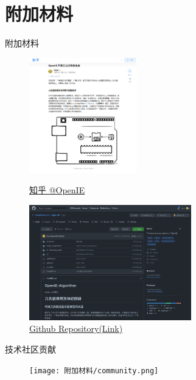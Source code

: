 \section{附加材料}
\begin{frame}{附加材料}
\begin{figure}[htbp]
\centering
\begin{minipage}[t]{0.35\textwidth}
\centering
\includegraphics[height=5cm]{附加材料/zhihu.png}
\caption{\href{https://zhuanlan.zhihu.com/p/585306798}{知乎 @OpenIE}}
\end{minipage}
\begin{minipage}[t]{0.60\textwidth}
\centering
\includegraphics[height=5cm]{附加材料/github.png}
\caption{\href{https://github.com/QianZeHao123/OpenIE}{Github Repository(Link)}}
\end{minipage}
\end{figure}
\end{frame}
% 
% 
\begin{frame}{技术社区贡献}
\begin{figure}[htp]
    \centering
    \texttt{[image: 附加材料/community.png]}
\end{figure}
\end{frame}